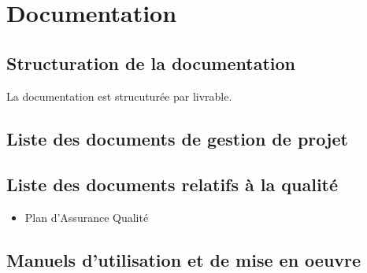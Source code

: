 \section{Documentation}

\subsection{Structuration de la documentation}
La documentation est strucuturée par livrable.

\subsection{Liste des documents de gestion de projet}


\subsection{Liste des documents relatifs à la qualité}

\begin{itemize}
    \item Plan d'Assurance Qualité
\end{itemize}

\subsection{Manuels d'utilisation et de mise en oeuvre}
